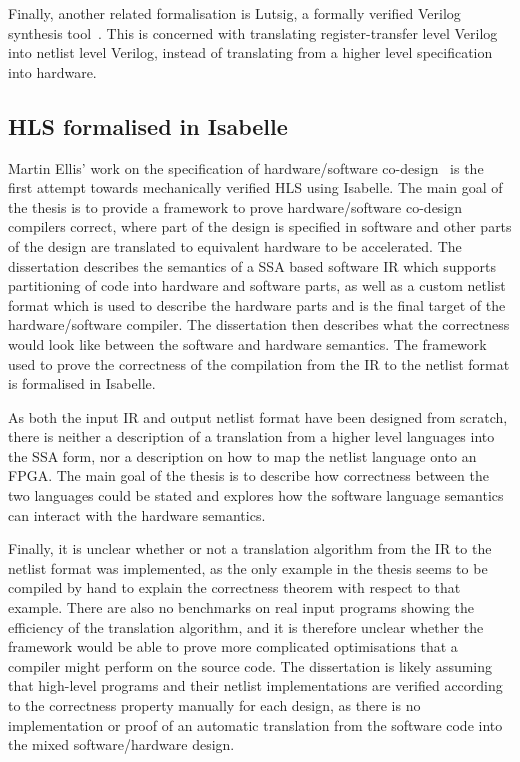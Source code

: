 Finally, another related formalisation is Lutsig, a formally verified Verilog
synthesis tool~\cite[]{lööw21_lutsig}.  This is concerned with translating
register-transfer level Verilog into netlist level Verilog, instead of
translating from a higher level specification into hardware.

\subsection{HLS formalised in Isabelle}

Martin Ellis' work on the specification of hardware/software
co-design~\cite{ellis08_csicgfu} is the first attempt towards mechanically
verified \gls{HLS} using Isabelle.  The main goal of the thesis is to provide a
framework to prove hardware/software co-design compilers correct, where part of
the design is specified in software and other parts of the design are translated
to equivalent hardware to be accelerated.  The dissertation describes the
semantics of a \gls{SSA} based software \gls{IR} which supports partitioning of
code into hardware and software parts, as well as a custom netlist format which
is used to describe the hardware parts and is the final target of the
hardware/software compiler.  The dissertation then describes what the
correctness would look like between the software and hardware semantics. The
framework used to prove the correctness of the compilation from the IR to the
netlist format is formalised in Isabelle.

As both the input IR and output netlist format have been designed from scratch,
there is neither a description of a translation from a higher level languages
into the \gls{SSA} form, nor a description on how to map the netlist language
onto an \gls{FPGA}.  The main goal of the thesis is to describe how correctness
between the two languages could be stated and explores how the software language
semantics can interact with the hardware semantics.

Finally, it is unclear whether or not a translation algorithm from the IR to the
netlist format was implemented, as the only example in the thesis seems to be
compiled by hand to explain the correctness theorem with respect to that
example.  There are also no benchmarks on real input programs showing the
efficiency of the translation algorithm, and it is therefore unclear whether the
framework would be able to prove more complicated optimisations that a compiler
might perform on the source code.  The dissertation is likely assuming that
high-level programs and their netlist implementations are verified according to
the correctness property manually for each design, as there is no implementation
or proof of an automatic translation from the software code into the mixed
software/hardware design.

